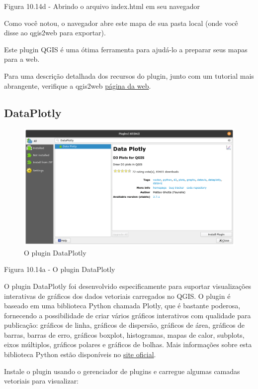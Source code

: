 \documentclass[
]{krantz}
\begin{document}
Figura 10.14d - Abrindo o arquivo index.html em seu navegador

Como você notou, o navegador abre este mapa de sua pasta local (onde você disse ao qgis2web para exportar).

Este plugin QGIS é uma ótima ferramenta para ajudá-lo a preparar seus mapas para a web.

Para uma descrição detalhada dos recursos do plugin, junto com um tutorial mais abrangente, verifique a qgis2web \href{https://github.com/tomchadwin/qgis2web}{página da web}.

\hypertarget{dataplotly}{%
\subsection{DataPlotly}\label{dataplotly}}

\begin{figure}
\centering
\includegraphics{media/modulo10/fig1015_a.png}
\caption{O plugin DataPlotly}
\end{figure}

Figura 10.14a - O plugin DataPlotly

O plugin DataPlotly foi desenvolvido especificamente para suportar visualizações interativas de gráficos dos dados vetoriais carregados no QGIS. O plugin é baseado em uma biblioteca Python chamada Plotly, que é bastante poderosa, fornecendo a possibilidade de criar vários gráficos interativos com qualidade para publicação: gráficos de linha, gráficos de dispersão, gráficos de área, gráficos de barras, barras de erro, gráficos boxplot, histogramas, mapas de calor, subplots, eixos múltiplos, gráficos polares e gráficos de bolhas. Mais informações sobre esta biblioteca Python estão disponíveis no \href{https://plotly.com/python/}{site oficial}.

Instale o plugin usando o gerenciador de plugins e carregue algumas camadas vetoriais para visualizar:
\end{document}
